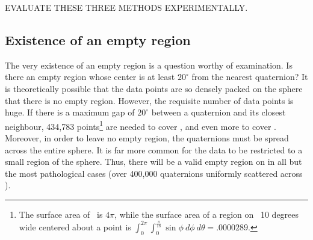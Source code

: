 \documentclass[12pt]{article}
\begin{document}
EVALUATE THESE THREE METHODS EXPERIMENTALLY.

\subsection{Existence of an empty region}
\label{sec:empty}

The very existence of an empty region is a question worthy of examination.
Is there an empty region whose center is at least $20^{\circ}$ from the
nearest quaternion?
It is theoretically possible that the data points are so densely packed
on the sphere that there is no empty region.
However, the requisite number of data points is huge.
If there is a maximum gap of $20^{\circ}$ between a quaternion and its
closest neighbour, 434,783 points\footnote{The surface area 
	of \ is $4\pi$, while the surface area
	of a region on \ 10 degrees wide centered about a point is 
	$\int_{0}^{2\pi} \int_0^{\frac{\pi}{18}}  \sin \phi \ d\phi \ d\theta
	= .0000289$.} %
are needed to cover , and even more to cover .
Moreover, in order to leave no empty region, the quaternions
must be spread across the entire sphere.
It is far more common for the data to be restricted to a small region
of the sphere.
Thus, there will be a valid empty region on  in all but the most
pathological cases (over 400,000 quaternions uniformly scattered across ).

\end{document}
